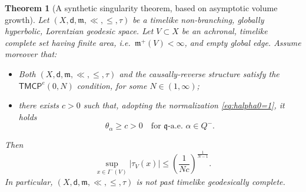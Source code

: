 \documentclass[a4paper,10pt]{article}
\newcommand{\mm}{\mathfrak m}
\newcommand{\qq}{\mathfrak q}
\newcommand{\sfd}{\mathsf d}
\theoremstyle{plain}
\newtheorem{theorem}[lemma]{Theorem}
\theoremstyle{definition}
\numberwithin{equation}{section}
\begin{document}
\begin{theorem}[A synthetic singularity theorem, based on asymptotic volume growth]\label{Thm:Secondsingular}
Let $(X,\sfd,\mm, \ll, \leq, \tau)$ be  a timelike non-branching,  globally hyperbolic, Lorentzian geodesic space. Let $V \subset X$ be an achronal, timelike complete set having finite area, i.e.\ $\mm^{+}(V) <\infty$, 
and  empty global edge.  
Assume moreover that: 
\begin{itemize}
\item Both $(X,\sfd,\mm, \ll, \leq, \tau)$ and the causally-reverse structure satisfy  the $\mathsf{TMCP}^e(0,N)$ condition, for some $N\in (1,\infty)$; 
\item there exists $c>0$ such that, adopting the normalization \eqref{eq:halpha0=1},  it holds 
\begin{equation}\label{eq:thetaalphageqc}
\theta_\alpha \geq c >0 \quad \text{for $\qq$-a.e. $\alpha \in Q^-$}. 
\end{equation}
\end{itemize}
%
Then 
\begin{equation}\label{eq:tauVleq1/c}
\sup_{x\in I^{-}(V)} |\tau_{V}(x)|  \leq \left(\frac{1}{Nc}\right)^{\frac{1}{N-1}}.
\end{equation}
In particular, $(X,\sfd,\mm, \ll, \leq, \tau)$  is not past timelike geodesically complete. 
\end{theorem}
\end{document}
